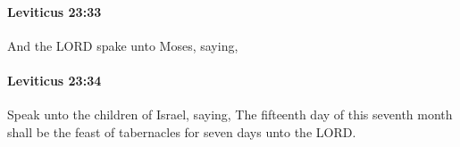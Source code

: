 		\paragraph{Leviticus 23:33} %
			\label{LEVITICUS-23-33}

			And the LORD spake unto Moses, saying,


		\paragraph{Leviticus 23:34} %
			\label{LEVITICUS-23-34}

			Speak unto the children of Israel, saying, The fifteenth day of this seventh month shall be the feast of tabernacles for seven days unto the LORD.


